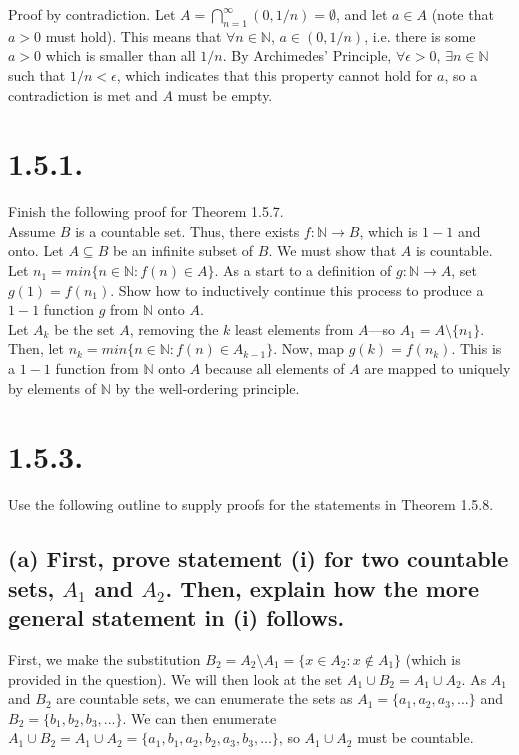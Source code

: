 \documentclass[12pt,letterpaper]{article}
\begin{document}
Proof by contradiction. Let \(A = \bigcap_{n=1}^{\infty} (0,1/n) = \emptyset\), and let \(a \in A\) (note that \(a > 0\) must hold). This means that \(\forall n \in \mathbb{N}\), \(a \in (0,1/n)\), i.e. there is some \(a > 0\) which is smaller than all \(1/n\). By Archimedes' Principle, \(\forall \epsilon > 0\), \(\exists n \in \mathbb{N}\) such that \(1/n < \epsilon\), which indicates that this property cannot hold for \(a\), so a contradiction is met and \(A\) must be empty.

\section*{1.5.1.}
Finish the following proof for Theorem 1.5.7. \\

Assume \(B\) is a countable set. Thus, there exists \(f: \mathbb{N} \rightarrow B\), which is \(1-1\) and onto. Let \(A \subseteq B\) be an infinite subset of \(B\). We must show that \(A\) is countable. \\

Let \(n_{1} = min\{n \in \mathbb{N} : f(n) \in A\}\). As a start to a definition of \(g : \mathbb{N} \rightarrow A\), set \(g(1) = f(n_{1})\). Show how to inductively continue this process to produce a \(1-1\) function \(g\) from \(\mathbb{N}\) onto \(A\). \\

Let \(A_{k}\) be the set \(A\), removing the \(k\) least elements from \(A\)---so \(A_{1} = A \setminus \{n_{1}\}\). Then, let \(n_{k} = min\{n \in \mathbb{N} : f(n) \in A_{k-1}\}\). Now, map \(g(k) = f(n_{k})\). This is a \(1-1\) function from \(\mathbb{N}\) onto \(A\) because all elements of \(A\) are mapped to uniquely by elements of \(\mathbb{N}\) by the well-ordering principle.

\section*{1.5.3.}
Use the following outline to supply proofs for the statements in Theorem 1.5.8.

\subsection*{(a) First, prove statement (i) for two countable sets, \(A_{1}\) and \(A_{2}\). Then, explain how the more general statement in (i) follows.}

First, we make the substitution \(B_{2} = A_{2} \setminus A_{1} = \{x \in A_{2} : x \notin A_{1}\}\) (which is provided in the question). We will then look at the set \(A_{1} \cup B_{2} = A_{1} \cup A_{2}\). As \(A_{1}\) and \(B_{2}\) are countable sets, we can enumerate the sets as \(A_{1} = \{a_{1}, a_{2}, a_{3},...\}\) and \(B_{2} = \{b_{1}, b_{2}, b_{3}, ...\}\). We can then enumerate \(A_{1} \cup B_{2} = A_{1} \cup A_{2} = \{a_{1}, b_{1}, a_{2}, b_{2}, a_{3}, b_{3}, ...\}\), so \(A_{1} \cup A_{2}\) must be countable. \\
\end{document}
